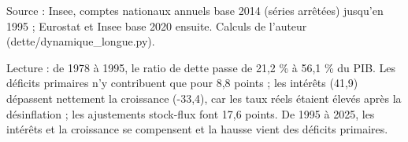 Source : Insee, comptes nationaux annuels base 2014 (séries arrêtées) jusqu'en 1995 ; Eurostat et Insee base 2020 ensuite. Calculs de l'auteur (dette/dynamique\_longue.py).\par Lecture : de 1978 à 1995, le ratio de dette passe de 21,2 \% à 56,1 \% du PIB. Les déficits primaires n'y contribuent que pour 8,8 points ; les intérêts (41,9) dépassent nettement la croissance (-33,4), car les taux réels étaient élevés après la désinflation ; les ajustements stock-flux font 17,6 points. De 1995 à 2025, les intérêts et la croissance se compensent et la hausse vient des déficits primaires.
